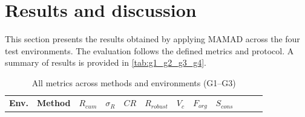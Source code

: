 \documentclass[pdflatex,sn-mathphys-num]{sn-jnl}%
\theoremstyle{thmstyleone}%
\theoremstyle{thmstyletwo}%
\theoremstyle{thmstylethree}%
\begin{document}
\section{Results and discussion} \label{sec:results}

This section presents the results obtained by applying MAMAD across the four test environments. The evaluation follows the defined metrics and protocol. A summary of results is provided in \autoref{tab:g1_g2_g3_g4}.

\medskip

\begin{table}[h!]
    \centering
    \caption{All metrics across methods and environments (G1--G3)}
    \footnotesize
    \begin{tabular}{p{0.5cm}|p{1cm}|p{0.4cm}p{0.3cm}p{0.3cm}p{0.85cm}|p{0.4cm}p{0.4cm}p{0.55cm}|p{0.8cm}p{0.8cm}p{0.8cm}}
        \hline
        \textbf{Env.} & \textbf{Method}

        
        
        
        
        
        
        
        
        
        
        
        
        
                      & $R_{cum}$       & $\sigma_R$   & $CR$       & $R_{robust}$

        
        
        
        
        
        
        
        
        
        
        
        
        
                      & $V_c$           & $F_{org}$    & $S_{cons}$

        
        
        
        
        
        
        
        
        
        
        
        

\end{tabular}
\end{table}
\end{document}
